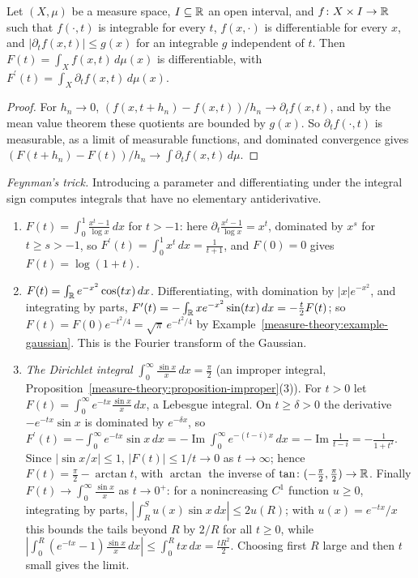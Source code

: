 \begin{proposition}\label{measure-theory:proposition-differentiation-integral}
Let $(X, \mu)$ be a measure space, $I \subseteq \mathbb{R}$ an open interval, and $f \colon X \times I \to \mathbb{R}$ such that $f(\cdot, t)$ is integrable for every $t$, $f(x, \cdot)$ is differentiable for every $x$,
and $|\partial_tf(x, t)| \leq g(x)$ for an integrable $g$ independent of $t$. Then $F(t) = \int_Xf(x, t)\,d\mu(x)$ is differentiable, with $F^{\prime}(t) = \int_X\partial_tf(x, t)\,d\mu(x)$.
\end{proposition}

\begin{proof}
For $h_n \to 0$, $(f(x, t + h_n) - f(x, t))/h_n \to \partial_tf(x, t)$, and by the mean value theorem these quotients are bounded by $g(x)$. So $\partial_tf(\cdot, t)$ is measurable, as a limit of
measurable functions, and dominated convergence gives $(F(t + h_n) - F(t))/h_n \to \int\partial_tf(x, t)\,d\mu$.
\end{proof}

\begin{example}\label{measure-theory:example-feynman}
\emph{Feynman's trick.} Introducing a parameter and differentiating under the integral sign computes integrals that have no elementary antiderivative.
\begin{enumerate}
\item $F(t) = \int_0^1\frac{x^t - 1}{\log x}\,dx$ for $t > -1$: here $\partial_t\frac{x^t - 1}{\log x} = x^t$, dominated by $x^{s}$ for $t \geq s > -1$, so $F^{\prime}(t) = \int_0^1x^t\,dx = \frac{1}{t + 1}$, and
$F(0) = 0$ gives $F(t) = \log(1 + t)$.
\item $F(t) = \int_{\mathbb{R}} e^{-x^2}\cos(tx)\,dx$. Differentiating, with domination by $|x|e^{-x^2}$, and integrating by parts,
$F^{\prime}(t) = -\int_{\mathbb{R}} xe^{-x^2}\sin(tx)\,dx = -\frac t2F(t)$; so $F(t) = F(0)e^{-t^2/4} = \sqrt\pi\,e^{-t^2/4}$ by Example~\ref{measure-theory:example-gaussian}. This is the Fourier transform of the
Gaussian.
\item \emph{The Dirichlet integral} $\int_0^\infty\frac{\sin x}{x}\,dx = \frac\pi2$ (an improper integral, Proposition~\ref{measure-theory:proposition-improper}(3)). For $t > 0$ let
$F(t) = \int_0^\infty e^{-tx}\frac{\sin x}{x}\,dx$, a Lebesgue integral. On $t \geq \delta > 0$ the derivative $-e^{-tx}\sin x$ is dominated by $e^{-\delta x}$, so
$F^{\prime}(t) = -\int_0^\infty e^{-tx}\sin x\,dx = -\operatorname{Im}\int_0^\infty e^{-(t - i)x}\,dx = -\operatorname{Im}\frac{1}{t - i} = -\frac{1}{1 + t^2}$. Since $|\sin x/x| \leq 1$,
$|F(t)| \leq 1/t \to 0$ as $t \to \infty$; hence $F(t) = \frac\pi2 - \arctan t$, with $\arctan$ the inverse of $\tan \colon (-\frac\pi2, \frac\pi2) \to \mathbb{R}$. Finally $F(t) \to \int_0^\infty\frac{\sin x}x$ as
$t \to 0^+$: for a nonincreasing $C^1$ function $u \geq 0$, integrating by parts, $|\int_R^Su(x)\sin x\,dx| \leq 2u(R)$; with $u(x) = e^{-tx}/x$ this bounds the tails beyond $R$ by $2/R$ for all
$t \geq 0$, while $|\int_0^R(e^{-tx} - 1)\frac{\sin x}{x}\,dx| \leq \int_0^Rtx\,dx = \frac{tR^2}2$. Choosing first $R$ large and then $t$ small gives the limit.
\end{enumerate}
\end{example}

